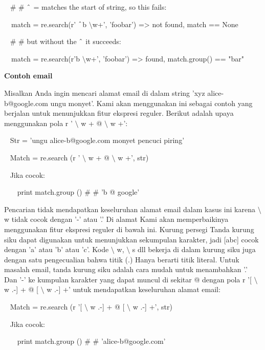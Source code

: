 \begin {enumerate}
\begin {enumerate}
~  $  \#  $ $  \#  $  $  \string^  $ = matches the start of string, so this fails:

~~match = re.search(r' $  \string^  $b $  \setminus  $w+', 'foobar') =>  not found, match == None

~  $  \#  $ $  \#  $ but without the  $  \string^  $ it succeeds:

~~match = re.search(r'b $  \setminus  $w+', 'foobar') =>  found, match.group() == "bar"

{\fontsize{14pt}{14pt}\selectfont \textbf{Contoh email} \\} \par
Misalkan Anda ingin mencari alamat email di dalam string 'xyz alice-b@google.com ungu monyet'. Kami akan menggunakan ini sebagai contoh yang berjalan untuk menunjukkan fitur ekspresi reguler. Berikut adalah upaya menggunakan pola r ' $  \setminus  $ w + @  $  \setminus  $ w +':

~ Str = 'ungu alice-b@google.com monyet pencuci piring'

~ Match = re.search (r ' $  \setminus  $ w + @  $  \setminus  $ w +', str)

~ Jika cocok:

~~~ print match.group ()  $  \#  $ $  \#  $ 'b @ google'

Pencarian tidak mendapatkan keseluruhan alamat email dalam kasus ini karena  $  \setminus  $ w tidak cocok dengan '-' atau '.' Di alamat Kami akan memperbaikinya menggunakan fitur ekspresi reguler di bawah ini. Kurung persegi Tanda kurung siku dapat digunakan untuk menunjukkan sekumpulan karakter, jadi [abc] cocok dengan 'a' atau 'b' atau 'c'. Kode  $  \setminus  $ w,  $  \setminus  $ s dll bekerja di dalam kurung siku juga dengan satu pengecualian bahwa titik (.) Hanya berarti titik literal. Untuk masalah email, tanda kurung siku adalah cara mudah untuk menambahkan '.' Dan '-' ke kumpulan karakter yang dapat muncul di sekitar @ dengan pola r '[ $  \setminus  $ w .-] + @ [ $  \setminus  $ w .-] +' untuk mendapatkan keseluruhan alamat email:

~ Match = re.search (r '[ $  \setminus  $ w .-] + @ [ $  \setminus  $ w .-] +', str)

~ Jika cocok:

~~~ print match.group ()  $  \#  $ $  \#  $ 'alice-b@google.com'


\end{enumerate}
\end{enumerate}
